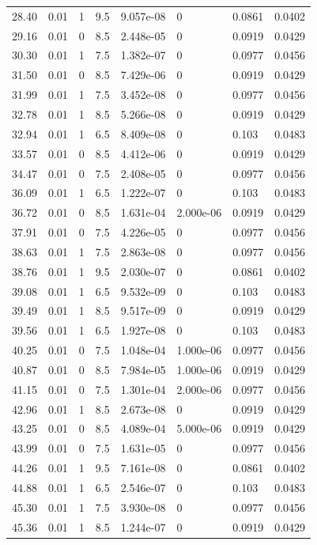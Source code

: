 \documentclass[preview]{standalone}
\begin{document}
{{{\begin{tabular}{L{1.2cm}C{1.2cm} C{0.3cm}C{0.5cm} C{1.4cm}C{1.4cm} C{1.4cm}C{1.4cm}}
  28.40  &  0.01  & 1     & 9.5 &  9.057e-08  & 0  & 0.0861 &  0.0402   \\ 
  29.16  &  0.01  & 0     & 8.5 &  2.448e-05  & 0  & 0.0919 &  0.0429   \\ 
  30.30  &  0.01  & 1     & 7.5 &  1.382e-07  & 0  & 0.0977 &  0.0456   \\ 
  31.50  &  0.01  & 0     & 8.5 &  7.429e-06  & 0  & 0.0919 &  0.0429   \\ 
  31.99  &  0.01  & 1     & 7.5 &  3.452e-08  & 0  & 0.0977 &  0.0456   \\ 
  32.78  &  0.01  & 1     & 8.5 &  5.266e-08  & 0  & 0.0919 &  0.0429   \\ 
  32.94  &  0.01  & 1     & 6.5 &  8.409e-08  & 0  & 0.103 &  0.0483   \\ 
  33.57  &  0.01  & 0     & 8.5 &  4.412e-06  & 0  & 0.0919 &  0.0429   \\ 
  34.47  &  0.01  & 0     & 7.5 &  2.408e-05  & 0  & 0.0977 &  0.0456   \\ 
  36.09  &  0.01  & 1     & 6.5 &  1.222e-07  & 0  & 0.103 &  0.0483   \\ 
  36.72  &  0.01  & 0     & 8.5 &  1.631e-04  & 2.000e-06  & 0.0919 &  0.0429   \\ 
  37.91  &  0.01  & 0     & 7.5 &  4.226e-05  & 0  & 0.0977 &  0.0456   \\ 
  38.63  &  0.01  & 1     & 7.5 &  2.863e-08  & 0  & 0.0977 &  0.0456   \\ 
  38.76  &  0.01  & 1     & 9.5 &  2.030e-07  & 0  & 0.0861 &  0.0402   \\ 
  39.08  &  0.01  & 1     & 6.5 &  9.532e-09  & 0  & 0.103 &  0.0483   \\ 
  39.49  &  0.01  & 1     & 8.5 &  9.517e-09  & 0  & 0.0919 &  0.0429   \\ 
  39.56  &  0.01  & 1     & 6.5 &  1.927e-08  & 0  & 0.103 &  0.0483   \\ 
  40.25  &  0.01  & 0     & 7.5 &  1.048e-04  & 1.000e-06  & 0.0977 &  0.0456   \\ 
  40.87  &  0.01  & 0     & 8.5 &  7.984e-05  & 1.000e-06  & 0.0919 &  0.0429   \\ 
  41.15  &  0.01  & 0     & 7.5 &  1.301e-04  & 2.000e-06  & 0.0977 &  0.0456   \\ 
  42.96  &  0.01  & 1     & 8.5 &  2.673e-08  & 0  & 0.0919 &  0.0429   \\ 
  43.25  &  0.01  & 0     & 8.5 &  4.089e-04  & 5.000e-06  & 0.0919 &  0.0429   \\ 
  43.99  &  0.01  & 0     & 7.5 &  1.631e-05  & 0  & 0.0977 &  0.0456   \\ 
  44.26  &  0.01  & 1     & 9.5 &  7.161e-08  & 0  & 0.0861 &  0.0402   \\ 
  44.88  &  0.01  & 1     & 6.5 &  2.546e-07  & 0  & 0.103 &  0.0483   \\ 
  45.30  &  0.01  & 1     & 7.5 &  3.930e-08  & 0  & 0.0977 &  0.0456   \\ 
  45.36  &  0.01  & 1     & 8.5 &  1.244e-07  & 0  & 0.0919 &  0.0429   \\ 
\hline 
\end{tabular} 

}}}
\end{document}
